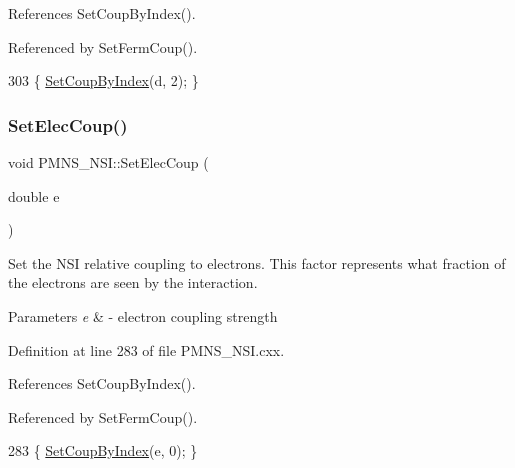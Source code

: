 References Set\+Coup\+By\+Index().



Referenced by Set\+Ferm\+Coup().


\begin{DoxyCode}
303 \{ \hyperlink{classOscProb_1_1PMNS__NSI_a276d475bbebcdf24502a5555ee65b136}{SetCoupByIndex}(d, 2); \}
\end{DoxyCode}
\mbox{\label{classOscProb_1_1PMNS__NSI_a8e07f5fe44e9ed471efa8e683584e2c7}} 
\subsubsection{\texorpdfstring{Set\+Elec\+Coup()}{SetElecCoup()}}
{\footnotesize\ttfamily void P\+M\+N\+S\+\_\+\+N\+S\+I\+::\+Set\+Elec\+Coup (\begin{DoxyParamCaption}\item[{double}]{e }\end{DoxyParamCaption})\hspace{0.3cm}{\ttfamily [virtual]}}

Set the N\+SI relative coupling to electrons. This factor represents what fraction of the electrons are seen by the interaction.


\begin{DoxyParams}{Parameters}
{\em e} & -\/ electron coupling strength \\
\hline
\end{DoxyParams}


Definition at line 283 of file P\+M\+N\+S\+\_\+\+N\+S\+I.\+cxx.



References Set\+Coup\+By\+Index().



Referenced by Set\+Ferm\+Coup().


\begin{DoxyCode}
283 \{ \hyperlink{classOscProb_1_1PMNS__NSI_a276d475bbebcdf24502a5555ee65b136}{SetCoupByIndex}(e, 0); \}
\end{DoxyCode}
\mbox{\label{classOscProb_1_1PMNS__Base_a95b3b0d0cab5e6a54b5ef99587f837c0}} 
